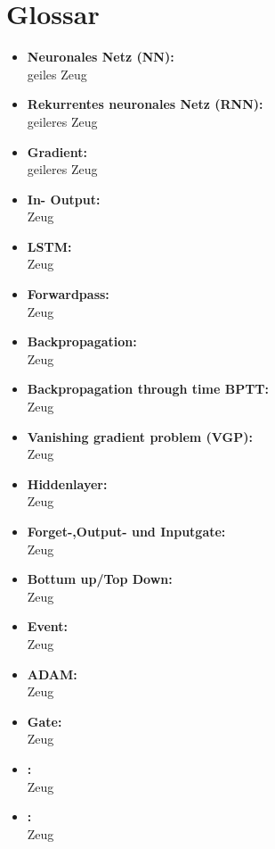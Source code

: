 \chapter{Glossar} 
\label{ch:glossar}
	\begin{itemize}
		\item \textbf{Neuronales Netz (NN):}\\
		geiles Zeug
		\item \textbf{Rekurrentes neuronales Netz (RNN):}\\
		geileres Zeug
		\item \textbf{Gradient:}\\
		geileres Zeug
		\item \textbf{In- Output:}\\
		Zeug
		\item \textbf{LSTM:}\\
		Zeug
		\item \textbf{Forwardpass:}\\
		Zeug
		\item \textbf{Backpropagation:}\\
		Zeug
		\item \textbf{Backpropagation through time BPTT:}\\
		Zeug
		\item \textbf{Vanishing gradient problem (VGP):}\\
		Zeug
		\item \textbf{Hiddenlayer:}\\
		Zeug
		\item \textbf{Forget-,Output- und Inputgate:}\\
		Zeug
		\item \textbf{Bottum up/Top Down:}\\
		Zeug
		\item \textbf{Event:}\\
		Zeug
		\item \textbf{ADAM:}\\
		Zeug
		\item \textbf{Gate:}\\
		Zeug
		\item \textbf{:}\\
		Zeug
		\item \textbf{:}\\
		Zeug
		
		
		
	
	\end{itemize}